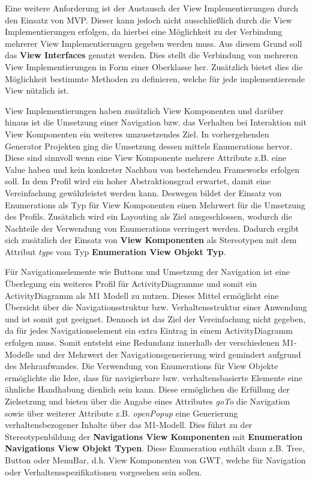 Eine weitere Anforderung ist der Austausch der View Implementierungen durch den
Einsatz von MVP. Dieser kann jedoch nicht ausschließlich durch die View
Implementierungen erfolgen, da hierbei eine Möglichkeit zu der
Verbindung mehrerer View Implementierungen gegeben werden muss. Aus diesem Grund
soll das \textbf{View Interfaces} genutzt werden. Dies stellt die Verbindung von mehreren
View Implementierungen in Form einer Oberklasse her. Zusätzlich bietet dies die
Möglichkeit bestimmte Methoden zu definieren, welche für jede implementierende
View nützlich ist. 

View Implementierungen haben zusätzlich View Komponenten und darüber hinaus ist
die Umsetzung einer Navigation bzw. das Verhalten bei Interaktion mit
View Komponenten ein weiteres umzusetzendes Ziel. In vorhergehenden Generator
Projekten ging die Umsetzung dessen mittels Enumerations hervor. Diese sind
sinnvoll wenn eine View Komponente mehrere Attribute z.B. eine Value haben
und kein konkreter Nachbau von bestehenden Frameworks erfolgen soll. In dem Profil
wird ein hoher Abstraktionsgrad erwartet, damit eine Vereinfachung gewährleistet
werden kann. Deswegen bildet der Einsatz von Enumerations als Typ für
View Komponenten einen Mehrwert für die Umsetzung des Profils. Zusätzlich wird ein Layouting als
Ziel ausgeschlossen, wodurch die Nachteile der Verwendung von Enumerations
verringert werden. Dadurch ergibt sich zusätzlich der Einsatz von \textbf{View
Komponenten} als Stereotypen mit dem Attribut \textit{type} vom Typ
\textbf{Enumeration View Objekt Typ}.

Für Navigationselemente wie Buttons und Umsetzung der Navigation ist eine
Überlegung ein weiteres Profil für ActivityDiagramme und somit ein
ActivityDiagramm als M1 Modell zu nutzen. Dieses Mittel ermöglicht eine
Übersicht über die Navigationsstruktur bzw. Verhaltensstruktur einer Anwendung
und ist somit gut geeignet. Dennoch ist das Ziel der Vereinfachung nicht
gegeben, da für jedes Navigationselement ein extra Eintrag in einem
ActivityDiagramm erfolgen muss. Somit entsteht eine Redundanz innerhalb der
verschiedenen M1-Modelle und der Mehrwert der Navigationsgenerierung wird
gemindert aufgrund des Mehraufwandes. Die Verwendung von Enumerations für View
Objekte ermöglichte die Idee, dass für navigierbare bzw. verhaltensbasierte Elemente
eine ähnliche Handhabung dienlich sein kann. Diese ermöglichen die Erfüllung der
Zielsetzung und bieten über die Angabe eines Attributes \textit{goTo} die
Navigation sowie über weiterer Attribute z.B. \textit{openPopup} eine
Generierung verhaltensbezogener Inhalte über das M1-Modell. Dies führt zu der
Stereotypenbildung der \textbf{Navigations View Komponenten} mit
\textbf{Enumeration Navigations View Objekt Typen}. Diese Enumeration enthält
dann z.B. Tree, Button oder MenuBar, d.h. View Komponenten von GWT, welche für
Navigation oder Verhaltensspezifikationen vorgesehen sein sollen.

